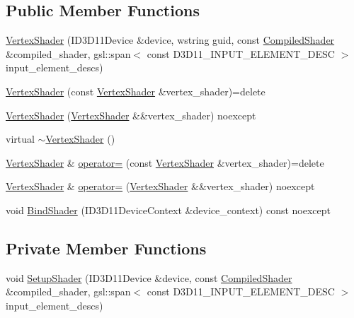 \subsection*{Public Member Functions}
\begin{DoxyCompactItemize}
\item 
\hyperlink{classmage_1_1rendering_1_1_vertex_shader_a6d7f46adfb3fa28c356490b24318007a}{Vertex\+Shader} (I\+D3\+D11\+Device \&device, wstring guid, const \hyperlink{classmage_1_1rendering_1_1_compiled_shader}{Compiled\+Shader} \&compiled\+\_\+shader, gsl\+::span$<$ const D3\+D11\+\_\+\+I\+N\+P\+U\+T\+\_\+\+E\+L\+E\+M\+E\+N\+T\+\_\+\+D\+E\+SC $>$ input\+\_\+element\+\_\+descs)
\item 
\hyperlink{classmage_1_1rendering_1_1_vertex_shader_a9236dfa05a74b64bdb0cb404b917d533}{Vertex\+Shader} (const \hyperlink{classmage_1_1rendering_1_1_vertex_shader}{Vertex\+Shader} \&vertex\+\_\+shader)=delete
\item 
\hyperlink{classmage_1_1rendering_1_1_vertex_shader_a2123d4bf4054ecb0de0c0491c59df0c1}{Vertex\+Shader} (\hyperlink{classmage_1_1rendering_1_1_vertex_shader}{Vertex\+Shader} \&\&vertex\+\_\+shader) noexcept
\item 
virtual \hyperlink{classmage_1_1rendering_1_1_vertex_shader_a4c57483ff1995a235472787b72ad4577}{$\sim$\+Vertex\+Shader} ()
\item 
\hyperlink{classmage_1_1rendering_1_1_vertex_shader}{Vertex\+Shader} \& \hyperlink{classmage_1_1rendering_1_1_vertex_shader_a4dff0bd19a0242300fbde0cc0a4497c4}{operator=} (const \hyperlink{classmage_1_1rendering_1_1_vertex_shader}{Vertex\+Shader} \&vertex\+\_\+shader)=delete
\item 
\hyperlink{classmage_1_1rendering_1_1_vertex_shader}{Vertex\+Shader} \& \hyperlink{classmage_1_1rendering_1_1_vertex_shader_a2d63073a65a136f2afa898af67eedb8b}{operator=} (\hyperlink{classmage_1_1rendering_1_1_vertex_shader}{Vertex\+Shader} \&\&vertex\+\_\+shader) noexcept
\item 
void \hyperlink{classmage_1_1rendering_1_1_vertex_shader_aa7090e902c68760713513fbfa33a1553}{Bind\+Shader} (I\+D3\+D11\+Device\+Context \&device\+\_\+context) const noexcept
\end{DoxyCompactItemize}
\subsection*{Private Member Functions}
\begin{DoxyCompactItemize}
\item 
void \hyperlink{classmage_1_1rendering_1_1_vertex_shader_a09e717d181f09bd4e50a758bd804705b}{Setup\+Shader} (I\+D3\+D11\+Device \&device, const \hyperlink{classmage_1_1rendering_1_1_compiled_shader}{Compiled\+Shader} \&compiled\+\_\+shader, gsl\+::span$<$ const D3\+D11\+\_\+\+I\+N\+P\+U\+T\+\_\+\+E\+L\+E\+M\+E\+N\+T\+\_\+\+D\+E\+SC $>$ input\+\_\+element\+\_\+descs)
\end{DoxyCompactItemize}
